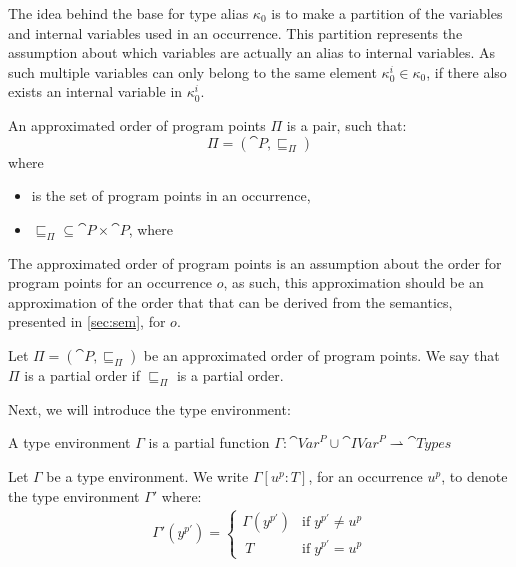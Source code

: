 \documentclass[../../master.tex]{subfiles}
\begin{document}
The idea behind the base for type alias $\kappa_0$ is to make a partition of the variables and internal variables used in an occurrence.
This partition represents the assumption about which variables are actually an alias to internal variables.
As such multiple variables can only belong to the same element $\kappa_0^i\in\kappa_0$, if there also exists an internal variable in $\kappa_0^i$.

\begin{definition}
	An approximated order of program points $\Pi$ is a pair, such that: 
	$$\Pi=(\cat{P},\sqsubseteq_\Pi)$$
	where
	\begin{itemize}
		\item {} is the set of program points in an occurrence,
		\item $\sqsubseteq_\Pi\subseteq\cat{P}\times\cat{P}$, where
	\end{itemize}
\end{definition}

The approximated order of program points is an assumption about the order for program points for an occurrence $o$, as such, this approximation should be an approximation of the order that that can be derived from the semantics, presented in \cref{sec:sem}, for $o$.

\begin{definition}
	Let $\Pi=(\cat{P},\sqsubseteq_\Pi)$ be an approximated order of program points.
	We say that $\Pi$ is a partial order if $\sqsubseteq_\Pi$ is a partial order.
\end{definition}
\bigskip

Next, we will introduce the type environment:
\begin{definition}
	A type environment $\Gamma$ is a partial function $\Gamma:\cat{Var}^P\cup\cat{IVar}^P\rightharpoonup\cat{Types}$
\end{definition}

\begin{definition}
	Let $\Gamma$ be a type environment.
	We write $\Gamma[u^p:T]$, for an occurrence $u^p$, to denote the type environment $\Gamma'$ where:
	\begin{align*}
		\Gamma'(y^{p'})=
		\left\{\begin{matrix}
			\Gamma(y^{p'}) & \mbox{if}\;y^{p'}\neq u^{p}\\\	 
			T & \mbox{if}\;y^{p'}=u^{p}
		\end{matrix}\right.
	\end{align*}
\end{definition}
\end{document}
